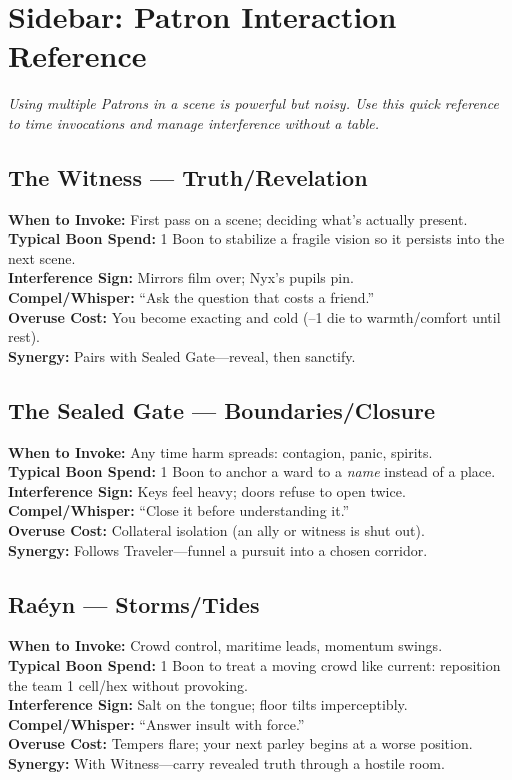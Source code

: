 \documentclass[11pt]{article}
\begin{document}
\section*{Sidebar: Patron Interaction Reference}
\emph{Using multiple Patrons in a scene is powerful but noisy. Use this quick reference to time invocations and manage interference without a table.}

\subsection*{The Witness — Truth/Revelation}
\textbf{When to Invoke:} First pass on a scene; deciding what’s actually present.\\
\textbf{Typical Boon Spend:} 1 Boon to stabilize a fragile vision so it persists into the next scene.\\
\textbf{Interference Sign:} Mirrors film over; Nyx’s pupils pin.\\
\textbf{Compel/Whisper:} “Ask the question that costs a friend.”\\
\textbf{Overuse Cost:} You become exacting and cold (–1 die to warmth/comfort until rest).\\
\textbf{Synergy:} Pairs with Sealed Gate—reveal, then sanctify.

\subsection*{The Sealed Gate — Boundaries/Closure}
\textbf{When to Invoke:} Any time harm spreads: contagion, panic, spirits.\\
\textbf{Typical Boon Spend:} 1 Boon to anchor a ward to a \emph{name} instead of a place.\\
\textbf{Interference Sign:} Keys feel heavy; doors refuse to open twice.\\
\textbf{Compel/Whisper:} “Close it before understanding it.”\\
\textbf{Overuse Cost:} Collateral isolation (an ally or witness is shut out).\\
\textbf{Synergy:} Follows Traveler—funnel a pursuit into a chosen corridor.

\subsection*{Raéyn — Storms/Tides}
\textbf{When to Invoke:} Crowd control, maritime leads, momentum swings.\\
\textbf{Typical Boon Spend:} 1 Boon to treat a moving crowd like current: reposition the team 1 cell/hex without provoking.\\
\textbf{Interference Sign:} Salt on the tongue; floor tilts imperceptibly.\\
\textbf{Compel/Whisper:} “Answer insult with force.”\\
\textbf{Overuse Cost:} Tempers flare; your next parley begins at a worse position.\\
\textbf{Synergy:} With Witness—carry revealed truth through a hostile room.
\end{document}
